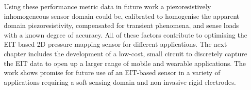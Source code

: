 Using these performance metric data in future work a piezoresistively inhomogeneous sensor domain could be, calibrated to homogenise the apparent domain piezoresistivity, compensated for transient phenomena, and sense loads with a known degree of accuracy. All of these factors contribute to optimising the EIT-based 2D pressure mapping sensor for different applications. The next chapter includes the development of a low-cost, small circuit to discretely capture the EIT data to open up a larger range of mobile and wearable applications. The work shows promise for future use of an EIT-based sensor in a variety of applications requiring a soft sensing domain and non-invasive rigid electrodes.

